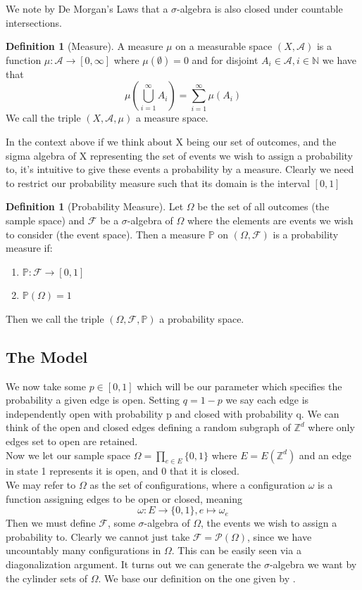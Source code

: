 \documentclass[a4paper,11pt]{article}
\theoremstyle{definition}
\newtheorem{definition}[theorem]{Definition}
\newcommand{\ints}{\mathbb{Z}}
\newcommand{\sigalg}{$\sigma$-algebra }
\begin{document}
We note by De Morgan's Laws that a $\sigma$-algebra is also closed under countable intersections.

\begin{definition}[Measure]
	A measure $\mu$ on a measurable space $(X,\mathcal{A})$ is a function $\mu: \mathcal{A} \rightarrow [0,\infty]$ where 
	$\mu(\emptyset) = 0 $ and for disjoint $A_i \in \mathcal{A}, i \in \mathbb{N}$ we have that
	$$ \mu(\bigcup^\infty_{i=1} A_i) = \sum_{i = 1}^{\infty} \mu(A_i)  $$
	We call the triple $(X,\mathcal{A},\mu)$ a measure space.
\end{definition}

In the context above if we think about X being our set of outcomes, and the sigma algebra of X representing the set of events we wish to assign a probability to, it's intuitive to give these events a probability by a measure. 
Clearly we need to restrict our probability measure such that its domain is the interval $[0,1]$ 

\begin{definition}[Probability Measure]
	Let $\Omega$ be the set of all outcomes (the sample space) and $\mathcal{F}$ be a \sigalg of $\Omega$ where the elements are events we wish to consider (the event space). Then a measure $\mathbb{P}$ on $(\Omega,\mathcal{F})$ is a probability measure if:
	\begin{enumerate}
		\item $\mathbb{P}: \mathcal{F} \rightarrow [0,1]$
		\item $\mathbb{P}(\Omega) = 1$
	\end{enumerate}
	Then we call the triple $(\Omega,\mathcal{F},\mathbb{P})$ a probability space.
	
\end{definition}

\subsection{The Model}

We now take some $p \in [0,1]$ which will be our parameter which specifies the probability a given edge is open. 
Setting $q = 1-p$ we say each edge is independently open with probability p and closed with probability q.
We can think of the open and closed edges defining a random subgraph of $\ints^d$ where only edges set to open are retained.\\

Now we let our sample space $\Omega = \prod_{e \in E} \{0,1\}$ where $E = E(\ints^d)$ and an edge in state 1 represents it is open, and 0 that it is closed.\\
We may refer to $\Omega$ as the set of configurations, where a configuration $\omega$ is a function assigning edges to be open or closed, meaning 
$$\omega:E \to \{0,1\}, e \mapsto \omega_e$$
Then we must define $\mathcal{F}$, some \sigalg of $\Omega$, the events we wish to assign a probability to. 
Clearly we cannot just take $\mathcal{F} = \mathcal{P}(\Omega)$, since we have uncountably many configurations in $\Omega$. 
This can be easily seen via a diagonalization argument. 
It turns out we can generate the \sigalg we want by the cylinder sets of $\Omega$. We base our definition on the one given by \cite{bollo2006}.
\end{document}
